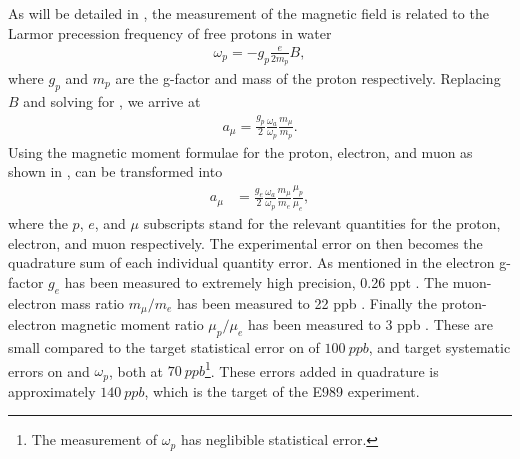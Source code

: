 As will be detailed in , the measurement of the magnetic field is related to the Larmor precession frequency of free protons in water 
        \begin{align} \label{eq:wp}
            \omega_{p} = -g_{p} \frac{e}{2m_{p}} B,
        \end{align}
where $g_{p}$ and $m_{p}$ are the g-factor and mass of the proton respectively. Replacing $B$ and solving for \amu, we arrive at 
        \begin{align} \label{eq:amu}
            a_{\mu} = \frac{g_{p}}{2} \frac{\omega_{a}}{\omega_{p}} \frac{m_{\mu}}{m_{p}}.
        \end{align}
Using the magnetic moment formulae for the proton, electron, and muon as shown in ,  can be transformed into
        \begin{align} 
            a_{\mu} &= \frac{g_{e}}{2} \frac{\omega_{a}}{\omega_{p}} \frac{m_{\mu}}{m_{e}} \frac{\mu_{p}}{\mu_{e}}, \label{eq:amuratios}
        \end{align}
where the $p$, $e$, and $\mu$ subscripts stand for the relevant quantities for the proton, electron, and muon respectively. The experimental error on \amu then becomes the quadrature sum of each individual quantity error. As mentioned in  the electron g-factor $g_{e}$ has been measured to extremely high precision, 0.26 ppt \cite{CODATA,ElectronMDM}. The muon-electron mass ratio $m_{\mu}/m_{e}$ has been measured to 22 ppb \cite{CODATA,MuoniumHyperfine}. Finally the proton-electron magnetic moment ratio $\mu_{p}/\mu_{e}$ has been measured to 3 ppb \cite{CODATA}. These are small compared to the target statistical error on \wa of $\SI{100}{ppb}$, and target systematic errors on \wa and $\omega_{p}$, both at $\SI{70}{ppb}$\footnote{The measurement of $\omega_{p}$ has neglibible statistical error.}. These errors added in quadrature is approximately $\SI{140}{ppb}$, which is the target of the E989 experiment.




